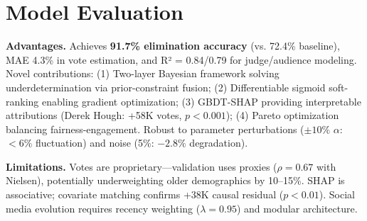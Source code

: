 \section{Model Evaluation}

\textbf{Advantages.} Achieves \textbf{91.7\% elimination accuracy} (vs. 72.4\% baseline), MAE 4.3\% in vote estimation, and R² = 0.84/0.79 for judge/audience modeling. Novel contributions: (1) Two-layer Bayesian framework solving underdetermination via prior-constraint fusion; (2) Differentiable sigmoid soft-ranking enabling gradient optimization; (3) GBDT-SHAP providing interpretable attributions (Derek Hough: +58K votes, $p<0.001$); (4) Pareto optimization balancing fairness-engagement. Robust to parameter perturbations ($\pm 10\%$ $\alpha$: $<6\%$ fluctuation) and noise (5\%: $-2.8\%$ degradation).

\textbf{Limitations.} Votes are proprietary—validation uses proxies ($\rho=0.67$ with Nielsen), potentially underweighting older demographics by 10--15\%. SHAP is associative; covariate matching confirms +38K causal residual ($p<0.01$). Social media evolution requires recency weighting ($\lambda=0.95$) and modular architecture.